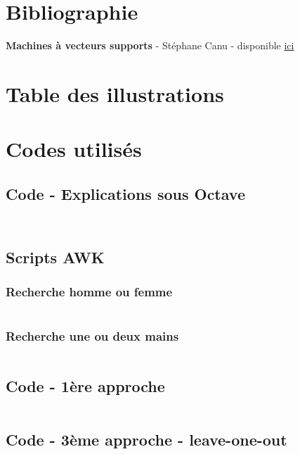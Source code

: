 \section{Bibliographie}
\textbf{Machines à vecteurs supports} - Stéphane Canu - disponible \href{http://www.math.univ-toulouse.fr/~besse/Wikistat/pdf/st-m-app-svm.pdf}{ici}

\section{Table des illustrations}
\listoffigures

\section{Codes utilisés}
\subsection{Code - Explications sous Octave}
\label{codeOctave}
\inputminted[frame=single]{octave}{fonctions/svmNonSepL1.m}
\inputminted[frame=single]{octave}{fonctions/svmNonSepL2.m}

\subsection{Scripts AWK}
\subsubsection{Recherche homme ou femme}
\label{scriptAwk}
\inputminted[frame=single]{ksh}{fonctions/scriptawk.awk}
\subsubsection{Recherche une ou deux mains}
\label{scriptMain}
\inputminted[frame=single]{ksh}{fonctions/scriptawkMain.awk}

\subsection{Code - 1ère approche}
\label{code1}
\inputminted[frame=single]{matlab}{fonctions/casReconnDejaConnu.m}

\subsection{Code - 3ème approche - leave-one-out}
\label{code3}
\inputminted[frame=single]{matlab}{fonctions/3emeAppr/script.m}
\inputminted[frame=single]{matlab}{fonctions/3emeAppr/crossValid.m}
\inputminted[frame=single]{matlab}{fonctions/3emeAppr/cross16.m}
\inputminted[frame=single]{matlab}{fonctions/3emeAppr/bornes.m}
